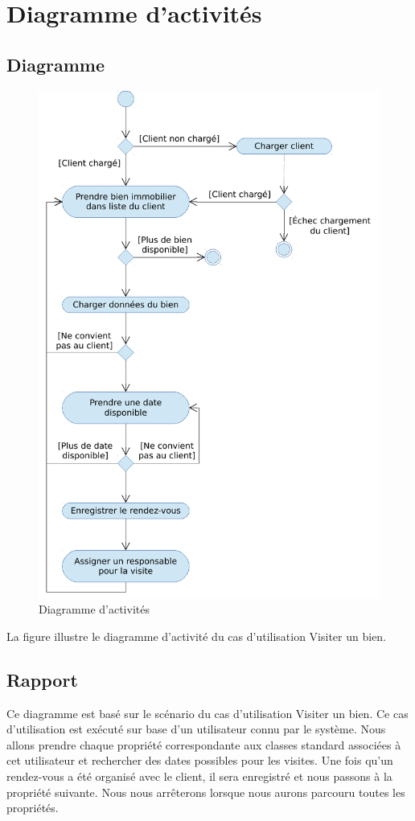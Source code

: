 \chapter{Diagramme d'activités}

\section{Diagramme}

\begin{figure}
  \centering
  \includegraphics[scale=0.67]{IMG/ad}
  \caption{Diagramme d'activités}
  \label{img_ad}
\end{figure}

La figure  illustre le diagramme d'activité du cas d'utilisation \og{}Visiter un bien\fg{}.

\section{Rapport}

Ce diagramme est basé sur le scénario du cas d'utilisation \og{}Visiter un bien\fg{}. Ce cas d'utilisation est exécuté sur base d'un utilisateur connu par le système. Nous allons prendre chaque propriété correspondante aux classes standard associées à cet utilisateur et rechercher des dates possibles pour les visites. Une fois qu'un rendez-vous a été organisé avec le client, il sera enregistré et nous passons à la propriété suivante. Nous nous arrêterons lorsque nous aurons parcouru toutes les propriétés.